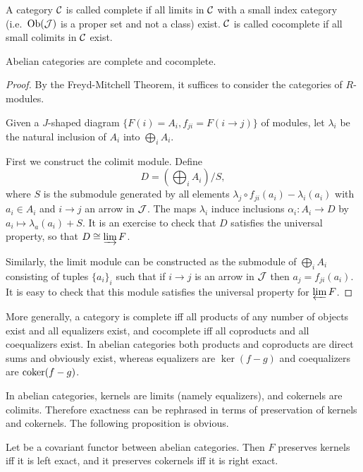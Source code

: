 \begin{defn}
    A category $\mathcal{C}$ is called complete if all limits in $\mathcal{C}$ with a small index category (i.e.~$\operatorname{Ob}(\mathcal{J})$ is a proper set and not a class) exist. $\mathcal{C}$ is called cocomplete if all small colimits in $\mathcal{C}$ exist.
\end{defn}

\begin{prop}\label{prop abelian complete and cocomplete}
    Abelian categories are complete and cocomplete.
\end{prop}
\begin{proof}
    By the Freyd-Mitchell Theorem, it suffices to consider the categories of $R$-modules. 
    
    Given a $J$-shaped diagram $\{F(i)=A_i,f_{ji}=F(i\to j)\}$ of modules, let $\lambda_i$ be the natural inclusion of $A_i$ into $\bigoplus_i A_i$. 
    
    First we construct the colimit module. Define
    \[D=\left(\bigoplus_i A_i\right)\slash S,\]
    where $S$ is the submodule generated by all elements $\lambda_j\circ f_{ji}(a_i)-\lambda_i(a_i)$ with $a_i\in A_i$ and $i\to j$ an arrow in $\mathcal{J}$. The maps $\lambda_i$ induce inclusions $\alpha_i: A_i\to D$ by $a_i\mapsto \lambda_a(a_i)+S$. It is an exercise to check that $D$ satisfies the universal property, so that $D\cong \varinjlim F$.

    Similarly, the limit module can be constructed as the submodule of $\bigoplus_i A_i$ consisting of tuples $\{a_i\}_{i}$ such that if $i\to j$ is an arrow in $\mathcal{J}$ then $a_j=f_{ji}(a_i)$. It is easy to check that this module satisfies the universal property for $\varprojlim F$.
\end{proof}
\begin{rem}
    More generally, a category is complete iff all products of any number of objects exist and all equalizers exist, and cocomplete iff all coproducts and all coequalizers exist. In abelian categories both products and coproducts are direct sums and obviously exist, whereas equalizers are $\ker(f-g)$ and coequalizers are $\operatorname{coker}(f-g)$.
\end{rem}

In abelian categories, kernels are limits (namely equalizers), and cokernels are colimits. Therefore exactness can be rephrased in terms of preservation of kernels and cokernels. The following proposition is obvious.

\begin{prop}
    Let be a covariant functor between abelian categories. Then $F$ preserves kernels iff it is left exact, and it preserves cokernels iff it is right exact.
\end{prop}

